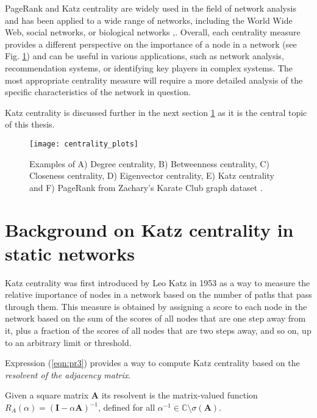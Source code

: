 PageRank and Katz centrality are widely used in the field of network analysis and has been applied to a wide range of networks, including the World Wide Web, social networks, or biological networks \cite{brin1998anatomy,jeong2001lethality},\cite[Ch.\ 5]{wasserman1994social}. Overall, each centrality measure provides a different perspective on the importance of a node in a network (see Fig. \ref{centrality}) and can be useful in various applications, such as network analysis, recommendation systems, or identifying key players in complex systems. The most appropriate centrality measure will require a more detailed analysis of the specific characteristics of the network in question.

Katz centrality is discussed further in the next section \ref{sec:back} as it is the central topic of this thesis.

\begin{figure}[h]\centering
	\texttt{[image: centrality\_plots]}
	\caption{Examples of A) Degree centrality, B) Betweenness centrality, C) Closeness centrality, D) Eigenvector centrality, E) Katz centrality and F) PageRank from Zachary’s Karate Club graph dataset \cite{zachary1977information}.}
	\label{centrality}
	\bigskip
\end{figure}

\section{Background on Katz centrality in static networks}
\label{sec:back}

Katz centrality was first introduced by Leo Katz \cite{katz1953new} in 1953 as a way to measure the relative importance of nodes in a network based on the number of paths that pass through them. This measure is obtained by assigning a score to each node in the network based on the sum of the scores of all nodes that are one step away from it, plus a fraction of the scores of all nodes that are two steps away, and so on, up to an arbitrary limit or threshold.

Expression (\ref{eqn:pr3}) provides a way to compute Katz centrality based on the \textit{resolvent of the adjacency matrix}.

\begin{definition}
    Given a square matrix $\mathbf{A}$ its resolvent is the matrix-valued function $R_A(\alpha) = (\mathbf{I} − \alpha \mathbf{A})^{−1}$, defined for all $\alpha^{-1} \in \mathbb{C}\setminus\sigma(\mathbf{A})$. 
\end{definition}

